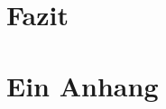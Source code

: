 \documentclass[a4paper, 11pt, oneside]{thesis/HSR}  %
\begin{document}
  \chapter{Fazit}\label{conclusions}
  \Blindtext



  \appendix %




  \chapter{Ein Anhang}
  \Blindtext
\end{document}
